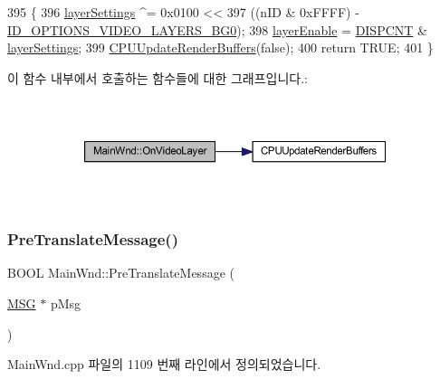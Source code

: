 \begin{DoxyCode}
395 \{
396   \mbox{\hyperlink{_globals_8cpp_aab45842fd405c5c9c24494c026a4441f}{layerSettings}} ^= 0x0100 <<
397     ((nID & 0xFFFF) - \mbox{\hyperlink{resource_8h_aa55a1b0cac56f9f05586ac1594a8b539}{ID\_OPTIONS\_VIDEO\_LAYERS\_BG0}});
398   \mbox{\hyperlink{_globals_8cpp_ae500546b58e29b2979143341072dfe7b}{layerEnable}} = \mbox{\hyperlink{_globals_8cpp_a843ca20ea4281609edb7d32392e31de8}{DISPCNT}} & \mbox{\hyperlink{_globals_8cpp_aab45842fd405c5c9c24494c026a4441f}{layerSettings}};
399   \mbox{\hyperlink{_main_wnd_options_8cpp_a4aaaf58652ea25b79f368f8ffb1a72f9}{CPUUpdateRenderBuffers}}(\textcolor{keyword}{false});
400   \textcolor{keywordflow}{return} TRUE;
401 \}
\end{DoxyCode}
이 함수 내부에서 호출하는 함수들에 대한 그래프입니다.\+:
\nopagebreak
\begin{figure}[H]
\begin{center}
\leavevmode
\includegraphics[width=350pt]{class_main_wnd_aba2fc4c22ea3cbda1187a08a85eeebbe_cgraph}
\end{center}
\end{figure}
\mbox{\label{class_main_wnd_a540792c5b97a767144d2bd821c46bfb3}} 
\subsubsection{\texorpdfstring{Pre\+Translate\+Message()}{PreTranslateMessage()}}
{\footnotesize\ttfamily B\+O\+OL Main\+Wnd\+::\+Pre\+Translate\+Message (\begin{DoxyParamCaption}\item[{\mbox{\hyperlink{prof_8cpp_a0c719c414608ef14852670b063876c07}{M\+SG}} $\ast$}]{p\+Msg }\end{DoxyParamCaption})\hspace{0.3cm}{\ttfamily [virtual]}}



Main\+Wnd.\+cpp 파일의 1109 번째 라인에서 정의되었습니다.


